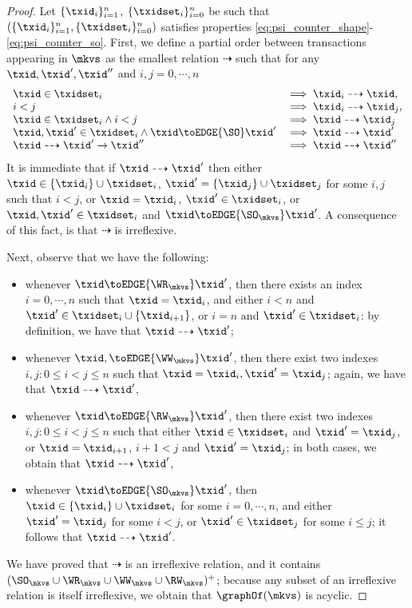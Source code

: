 \begin{proof}
Let $\{\txid_{i}\}_{i=1}^{n}$, $\{\txidset_{i}\}_{i=0}^{n}$ 
be such that $(\{\txid_{i}\}_{i=1}^{n}, \{\txidset_{i}\}_{i=0}^{n})$ 
satisfies properties \eqref{eq:psi_counter_shape}-\eqref{eq:psi_counter_so}. 
First, we define a partial order between transactions appearing in $\mkvs$ 
as the smallest relation $\dashrightarrow$ such that for any $\txid, \txid', \txid''$ and 
$i,j = 0,\cdots, n$
\[
\begin{array}{ll}
\txid \in \txidset_{i} &\implies \txid_{i} \dashrightarrow \txid,\\
i < j &\implies \txid_{i} \dashrightarrow \txid_{j},\\
\txid \in \txidset_{i} \land i < j & \implies \txid \dashrightarrow \txid_{j}\\
\txid, \txid' \in \txidset_{i} \land \txid \toEDGE{\SO} \txid' &\implies \txid \dashrightarrow \txid'\\
\txid \dashrightarrow \txid' \rightarrow \txid'' &\implies \txid \dashrightarrow \txid''
\end{array}
\]
It is immediate that if $\txid \dashrightarrow \txid'$ then either $\txid \in \{\txid_{i}\} \cup \txidset_i$, 
$\txid' = \{\txid_{j}\} \cup \txidset_{j}$ for some $i,j$ such that $i < j$, or $\txid = \txid_{i}$, $\txid' \in \txidset_i$, 
or $\txid, \txid' \in \txidset_{i}$ and $\txid \toEDGE{\SO_{\mkvs}} \txid'$. A consequence of this fact, 
is that $\dashrightarrow$ is irreflexive.

Next, observe that we have the following: 
\begin{itemize}
\item whenever $\txid \toEDGE{\WR_{\mkvs}} \txid'$, then 
there exists an index $i = 0,\cdots, n$ such that $\txid = \txid_{i}$, 
and either $i < n$ and $\txid' \in \txidset_{i} \cup \{ \txid_{i+1} \}$, 
or $i = n$ and $\txid' \in \txidset_{i}$: by definition, we have that $\txid \dashrightarrow \txid'$;
\item whenever $\txid, \toEDGE{\WW_{\mkvs}} \txid'$, 
then there exist two indexes $i, j: 0 \leq i < j \leq n$ such that 
$\txid = \txid_{i}, \txid' = \txid_{j}$; again, we have that $\txid \dashrightarrow \txid'$, 
\item whenever $\txid \toEDGE{\RW_{\mkvs}} \txid'$, then 
there exist two indexes $i, j: 0 \leq i < j \leq n$ such that either 
$\txid \in \txidset_{i}$ and $\txid' = \txid_{j}$, or $\txid = \txid_{i+1}$, 
$i+1 < j$ and $\txid' = \txid_{j}$; in both cases, we obtain that $\txid \dashrightarrow \txid'$,
\item whenever $\txid \toEDGE{\SO_{\mkvs}} \txid'$, then 
$\txid \in \{\txid_{i}\} \cup \txidset_{i}$ for some $i=0,\cdots,n$, 
and either $\txid' = \txid_{j}$ for some $i < j$,  or $\txid' \in \txidset_{j}$ for 
some $i \leq j$; it follows that $\txid \dashrightarrow \txid'$.
\end{itemize}

We have proved that $\dashrightarrow$ is an irreflexive relation, and it contains $(\SO_{\mkvs} \cup \WR_{\mkvs} \cup \WW_{\mkvs} \cup \RW_{\mkvs})^+$; 
because any subset of an irreflexive relation is itself irreflexive, we obtain that $\graphOf(\mkvs)$ is acyclic.
\end{proof}


